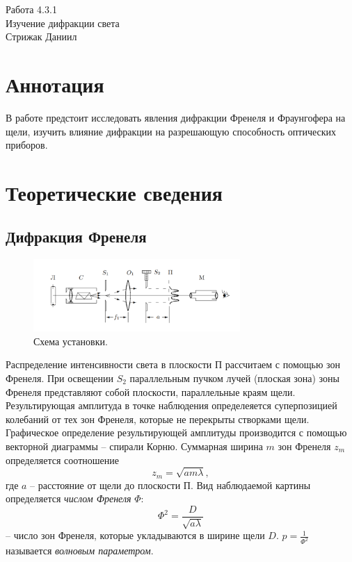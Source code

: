 



\begin{center}
  \LARGE{Работа 4.3.1}\\[0.2cm]
  \LARGE{Изучение дифракции света}\\[0.2cm]
  \large{Стрижак Даниил}\\[0.2cm]
\end{center}  
  

\section{Аннотация}

В работе предстоит исследовать явления дифракции Френеля и Фраунгофера на щели, изучить влияние дифракции на разрешающую способность оптических приборов.

\section{Теоретические сведения}
\subsection*{Дифракция Френеля}
\begin{figure}[h]
\includegraphics[width=0.7\textwidth]{1.png}
\centering
\caption{Схема установки.}
\end{figure}
Распределение интенсивности света в плоскости П рассчитаем с помощью зон Френеля. При освещении $S_2$ параллельным пучком лучей (плоская зона) зоны Френеля представляют собой плоскости, параллельные краям щели. Результирующая амплитуда в точке наблюдения определеяется суперпозицией колебаний от тех зон Френеля, которые не перекрыты створками щели. Графическое определение результирующей амплитуды производится с помощью векторной диаграммы -- спирали Корню. Суммарная ширина $m$ зон Френеля $z_m$ определяется соотношение
\begin{equation}
z_m = \sqrt{am\lambda},
\end{equation}
где $a$ -- расстояние от щели до плоскости П. Вид наблюдаемой картины определяется \textit{числом Френеля} $\Phi$:
$$
\Phi^2 = \dfrac{D}{\sqrt{a\lambda}}
$$
-- число зон Френеля, которые укладываются в ширине щели $D$. $p = \frac{1}{\Phi^2}$ называется \textit{волновым параметром}. 

